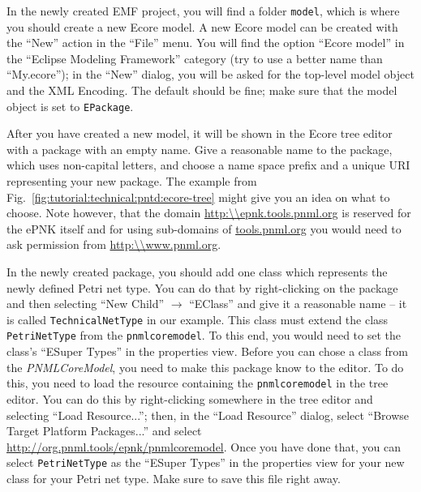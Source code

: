In the newly created EMF project, you will find a folder {\tt model}, which is
where you should create a new Ecore model. A new Ecore model can be created
with the ``New'' action in the ``File'' menu. You will find the option ``Ecore
model'' in the ``Eclipse Modeling Framework'' category (try to use a
better name than ``My.ecore''); in the ``New'' dialog, you will be asked for
the top-level model object and the XML Encoding. The default should be
fine; make sure that the model object is set to {\tt EPackage}.

After you have created a new model, it will be shown in the Ecore tree
editor with a package with an empty name. Give a reasonable name to the package,
which uses non-capital letters, and choose a name space prefix and a unique URI
 representing your new package. The example from
Fig.~\ref{fig:tutorial:technical:pntd:ecore-tree} might give you an idea
on what to choose. Note however, that the domain
\url{http:\\epnk.tools.pnml.org} is reserved for the ePNK itself and for using
sub-domains of \url{tools.pnml.org} you would need to ask permission from
\url{http:\\www.pnml.org}.

In the newly created package, you should add one class which represents the
newly defined Petri net type. You can do that by right-clicking on the package
and then selecting ``New Child'' $\rightarrow$ ``EClass'' and give it a
reasonable name -- it is called {\tt TechnicalNetType} in our example. This
class must extend the class {\tt PetriNetType} from the {\tt pnmlcoremodel}. To this
end, you would need to set the class's ``ESuper Types'' in the properties view.
Before you can chose a class from the \emph{PNMLCoreModel}, you need to make
this package know to the editor. To do this, you need to load the resource containing
the {\tt pnmlcoremodel} in the tree editor. You can do this by right-clicking
somewhere in the tree editor and selecting ``Load Resource...''; then, in the
``Load Resource'' dialog, select ``Browse Target Platform Packages...'' and
select \url{http://org.pnml.tools/epnk/pnmlcoremodel}. Once you have done that,
you can select {\tt PetriNetType} as the ``ESuper Types'' in the properties view for your new class
for your Petri net type. Make sure to save this file right away.


